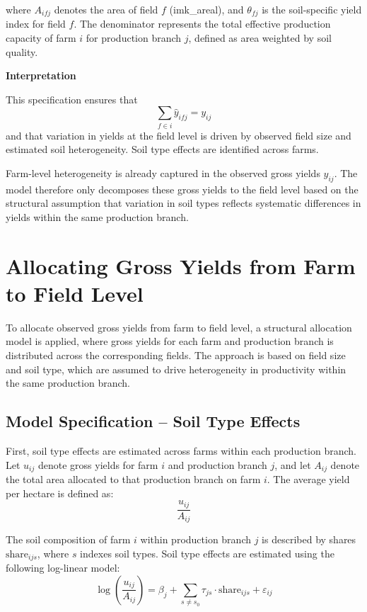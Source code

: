 \documentclass{article}
\begin{document}
where $A_{ifj}$ denotes the area of field $f$ (imk\_areal), and $\theta_{fj}$ is the soil-specific yield index for field $f$. The denominator represents the total effective production capacity of farm $i$ for production branch $j$, defined as area weighted by soil quality.

\vspace{0.5cm}

\textbf{Interpretation}

This specification ensures that 
\[
\sum_{f \in i} \hat{y}_{ifj} = y_{ij}
\]
and that variation in yields at the field level is driven by observed field size and estimated soil heterogeneity. Soil type effects are identified across farms.

Farm-level heterogeneity is already captured in the observed gross yields $y_{ij}$. The model therefore only decomposes these gross yields to the field level based on the structural assumption that variation in soil types reflects systematic differences in yields within the same production branch. 

\section{Allocating Gross Yields from Farm to Field Level} 

To allocate observed gross yields from farm to field level, a structural allocation model is applied, where gross yields for each farm and production branch is distributed across the corresponding fields. The approach is based on field size and soil type, which are assumed to drive heterogeneity in productivity within the same production branch.

\subsection{Model Specification – Soil Type Effects}

First, soil type effects are estimated across farms within each production branch. Let $u_{ij}$ denote gross yields for farm $i$ and production branch $j$, and let $A_{ij}$ denote the total area allocated to that production branch on farm $i$. The average yield per hectare is defined as:
\[
\frac{u_{ij}}{A_{ij}}
\]

The soil composition of farm $i$ within production branch $j$ is described by shares $\text{share}_{ijs}$, where $s$ indexes soil types. Soil type effects are estimated using the following log-linear model:
\[
\log\left(\frac{u_{ij}}{A_{ij}}\right)
=
\beta_j
+
\sum_{s \neq s_0} \tau_{js} \cdot \text{share}_{ijs}
+
\varepsilon_{ij}
\]
\end{document}

